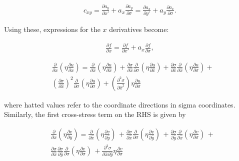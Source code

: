 \begin{align*}
c_{xy} = \frac{\partial a_y}{\partial x'} + a_x \frac{\partial a_y}{\partial \sigma} 
       = \frac{\partial a_x}{\partial y'} + a_y \frac{\partial a_x}{\partial \sigma}.
\end{align*}

Using these, expressions for the $x$ derivatives become:

\begin{align*}
\frac{\partial f}{\partial x} = \frac{\partial f}{\partial x'} + a_x \frac{\partial f}{\partial \sigma},
\end{align*}

\begin{align*}
 & \frac{\partial }{\partial x}\left( \eta \frac{\partial u}{\partial x} \right)=\frac{\partial }{\partial \hat{x}}\left( \eta \frac{\partial u}{\partial \hat{x}} \right)+\frac{\partial \sigma }{\partial \hat{x}}\frac{\partial }{\partial \sigma }\left( \eta \frac{\partial u}{\partial \hat{x}} \right)+\frac{\partial \sigma }{\partial \hat{x}}\frac{\partial }{\partial \hat{x}}\left( \eta \frac{\partial u}{\partial \sigma } \right)+ \\
& \left( \frac{\partial \sigma }{\partial \hat{x}} \right)^{2}\frac{\partial }{\partial \sigma }\left( \eta \frac{\partial u}{\partial \sigma } \right)+\left( \frac{\partial _{{}}^{2}\sigma }{\partial \hat{x}_{{}}^{2}} \right)\eta \frac{\partial u}{\partial \sigma }
\end{align*}

where hatted values refer to the coordinate directions in sigma coordinates. Similarly, the first cross-stress term on the RHS is given by

\begin{align*}
&\frac{\partial }{\partial x}\left( \eta \frac{\partial v}{\partial y} \right)=\frac{\partial }{\partial \hat{x}}\left( \eta \frac{\partial v}{\partial \hat{y}} \right)\,+\frac{\partial \sigma }{\partial \hat{x}}\frac{\partial }{\partial \sigma }\left( \eta \frac{\partial v}{\partial \hat{y}} \right)\,+\frac{\partial \sigma }{\partial \hat{y}}\frac{\partial }{\partial \hat{x}}\left( \eta \frac{\partial v}{\partial \sigma } \right)\,+ \\
&\frac{\partial \sigma }{\partial \hat{x}}\frac{\partial \sigma }{\partial \hat{y}}\frac{\partial }{\partial \sigma }\left( \eta \frac{\partial v}{\partial \sigma } \right)\,+\frac{\partial _{{}}^{2}\sigma }{\partial \hat{x}\partial \hat{y}}\eta \frac{\partial v}{\partial \sigma }\,
\end{align*}


